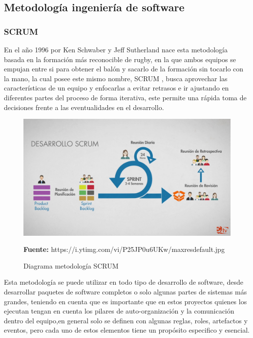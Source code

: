 \subsection{Metodología ingeniería de software}
\subsubsection{SCRUM}

En el año 1996 por Ken Schwaber y Jeff Sutherland nace esta metodología basada en la formación más reconocible de rugby, en la que ambos equipos se empujan entre si para obtener el balón y sacarlo de la formación sin tocarlo con la mano, la cual posee este mismo nombre, SCRUM \parencite{AlexanderMenzinskyGertrudisLopez2016ScrumManage}, busca aprovechar las características de un equipo y enfocarlas a evitar retrasos  e ir ajustando en diferentes partes del proceso de forma iterativa, este permite una rápida toma de decisiones frente a las eventualidades en el desarrollo.

\begin{figure}[H]
    \centering
    \includegraphics[width=1\textwidth]{Anexos/LATEX/chapters/images/maxresdefault.jpg}
    \caption{Diagrama metodología SCRUM}
    \small{\textbf{Fuente:} https://i.ytimg.com/vi/P25JP0u6UKw/maxresdefault.jpg}
    \label{SCRUM}
\end{figure}

Esta metodología se puede utilizar en todo tipo de desarrollo de software, desde desarrollar paquetes de software completos o solo algunas partes de sistemas más grandes, teniendo en cuenta que es importante que en estos proyectos quienes los ejecutan tengan en cuenta los pilares de auto-organización y la comunicación dentro del equipo,en general solo se definen con algunas reglas, roles, artefactos y eventos, pero cada uno de estos elementos tiene un propósito especifico y esencial.

